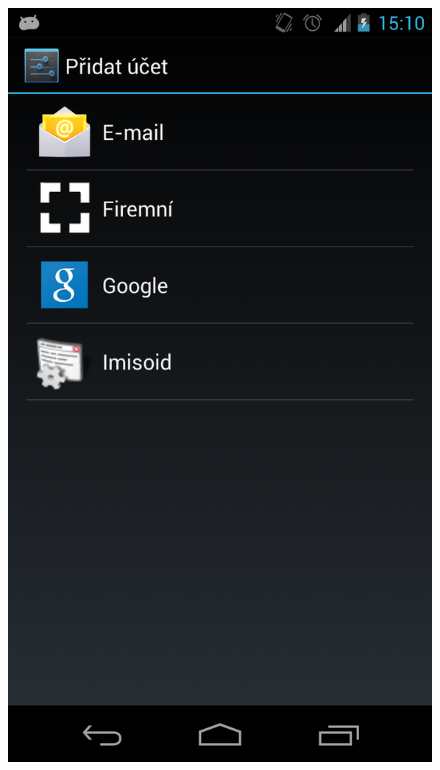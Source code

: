 \documentclass{diplomka}
\begin{document}
\begin{figure}[H]
  \centering
  \includegraphics[scale=0.3]{scr/ucet.png}
  \label{}
\end{figure}
\end{document}
